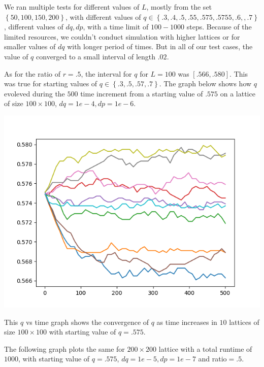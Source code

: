 \documentclass[article, 11pt, a4paper, onesize]{memoir}
\begin{document}
We ran multiple tests for different values of \(L\), mostly from the set \(\left\{50, 100,
150, 200\right\}\), with different values of \(q \in \left\{.3, .4, .5, .55, .575, .5755, .6,
, .7\right\}\), different values of \(dq, dp\), with a time limit of \(100-1000\) steps.
Because of the limited resources, we couldn't conduct simulation with higher lattices or
for smaller values of \(dq\) with longer period of times. But in all of our test cases,
the value of \(q\) converged to a small interval of length \(.02\).

As for the ratio of \(r=.5\), the interval for \(q\) for \(L=100\) was \([.566, .580]\).
This was true for starting values of \(q \in \left\{.3, .5, .57, .7\right\}\). The graph
below shows how \(q\) evoleved during the \(500\) time increment from a starting value of
\(.575\) on a lattice of size \(100\times 100\), \(dq = 1e-4, dp =1e-6\).

\begin{minipage}{.7\linewidth}
    \begin{center}
        \includegraphics[width=.9\linewidth]{q_converges_L100_q575_r5_num10_dq1e-4.png}
    \end{center}
\end{minipage}\hfill%
\begin{minipage}{.29\linewidth}
    This \(q\) vs time graph shows the convergence of \(q\) as time increases in
    \(10\) lattices of size \(100\times 100\) with starting value of \(q=.575\).
\end{minipage}


The following graph plots the same for \(200 \times 200\) lattice with a total runtime
of \(1000\), with starting value of \(q=.575\), \(dq = 1e-5, dp =1e-7\) and
ratio\(=.5\).
\end{document}
